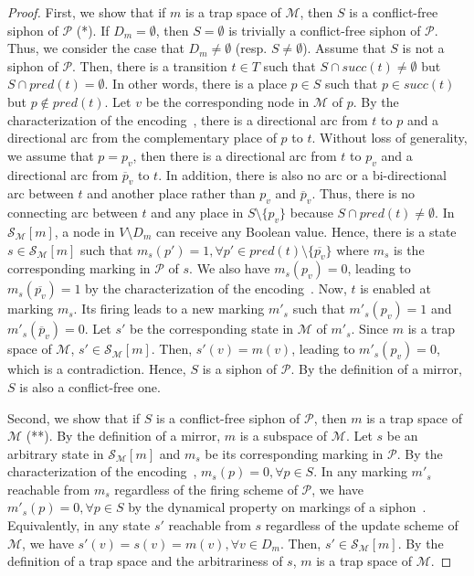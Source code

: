\documentclass[runningheads]{llncs}
\begin{document}
\begin{proof}

  First, we show that if \(m\) is a trap space of \(\mathcal{M}\), then \(S\) is a conflict-free siphon of \(\mathcal{P}\) (*). If \(D_m = \emptyset\), then \(S = \emptyset\) is trivially a conflict-free siphon of \(\mathcal{P}\). Thus, we consider the case that \(D_m \neq \emptyset\) (resp. \(S \neq \emptyset\)). Assume that \(S\) is not a siphon of \(\mathcal{P}\). Then, there is a transition \(t \in T\) such that \(S\cap succ(t)\not =\emptyset\) but \(S\cap pred(t)=\emptyset\). In other words, there is a place \(p \in S\) such that \(p \in succ(t)\) but \(p \not \in pred(t)\). Let \(v\) be the corresponding node in \(\mathcal{M}\) of \(p\). By the characterization of the encoding~\cite{chaouiya2004qualitative}, there is a directional arc from \(t\) to \(p\) and a directional arc from the complementary place of \(p\) to \(t\). Without loss of generality, we assume that \(p = p_v\), then there is a directional arc from \(t\) to \(p_v\) and a directional arc from \(\overline{p}_v\) to \(t\). In addition, there is also no arc or a bi-directional arc between \(t\) and another place rather than \(p_v\) and \(\overline{p}_v\). Thus, there is no connecting arc between \(t\) and any place in \(S \setminus \{p_v\}\) because \(S\cap pred(t)\not =\emptyset\). In \(\mathcal{S}_{\mathcal{M}}[m]\), a node in \(V \setminus D_m\) can receive any Boolean value. Hence, there is a state \(s \in \mathcal{S}_{\mathcal{M}}[m]\) such that \(m_s(p') = 1, \forall p' \in pred(t) \setminus \{\overline{p_v}\}\) where \(m_s\) is the corresponding marking in \(\mathcal{P}\) of \(s\). We also have \(m_s(p_v) = 0\), leading to \(m_s(\overline{p_v}) = 1\) by the characterization of the encoding~\cite{chaouiya2004qualitative}. Now, \(t\) is enabled at marking \(m_s\). Its firing leads to a new marking \(m'_s\) such that \(m'_s(p_v) = 1\) and \(m'_s(\overline{p}_v) = 0\). Let \(s'\) be the corresponding state in \(\mathcal{M}\) of \(m'_s\). Since \(m\) is a trap space of \(\mathcal{M}\), \(s' \in \mathcal{S}_{\mathcal{M}}[m]\). Then, \(s'(v) = m(v)\), leading to \(m'_s(p_v) = 0\), which is a contradiction. Hence, \(S\) is a siphon of \(\mathcal{P}\). By the definition of a mirror, \(S\) is also a conflict-free one.
  
  Second, we show that if \(S\) is a conflict-free siphon of \(\mathcal{P}\), then \(m\) is a trap space of \(\mathcal{M}\) (**). By the definition of a mirror, \(m\) is a subspace of \(\mathcal{M}\). Let \(s\) be an arbitrary state in \(\mathcal{S}_{\mathcal{M}}[m]\) and \(m_s\) be its corresponding marking in \(\mathcal{P}\). By the characterization of the encoding~\cite{chaouiya2004qualitative}, \(m_s(p) = 0, \forall p \in S\). In any marking \(m'_s\) reachable from \(m_s\) regardless of the firing scheme of \(\mathcal{P}\), we have \(m'_s(p) = 0, \forall p \in S\) by the dynamical property on markings of a siphon~\cite{DBLP:journals/isci/LiuB16}. Equivalently, in any state \(s'\) reachable from \(s\) regardless of the update scheme of \(\mathcal{M}\), we have \(s'(v) = s(v) = m(v), \forall v \in D_m\). Then, \(s' \in \mathcal{S}_{\mathcal{M}}[m]\). By the definition of a trap space and the arbitrariness of \(s\), \(m\) is a trap space of \(\mathcal{M}\).
  

\end{proof}
\end{document}
